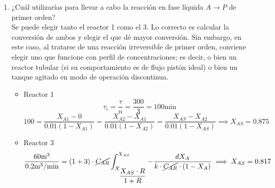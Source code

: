 \begin{enumerate}[label={\alph*)}]
\begin{itemize}
		            \noindent Solo existe una opción de modelización: la de modelos mezclados. El reactor es de tipo tanque agitado.
		      \item \textbf{Para el reactor 3:}\\
		            No existe bypass ni volumen estanco, puesto que $\int E\,d\theta = 1$ y $\int \theta E\,d\theta = 1$. Con la última integral se calcula la varianza:
		            \begin{equation*}
			            \sigma^2 = \int \theta^2 E\,d\theta - 1 = 1.75 -1 = 0.75
		            \end{equation*}
		            Por lo tanto, estamos ante un reactor de tipo tanque agitado, el cual modelizamos como un RCFP con recirculación (RCFP-R), recordando que la recirculación se puede calcular mediante la varianza:
		            \begin{equation*}
			            \sigma^2 = \frac{1}{1+R} \quad \implies R = 3
		            \end{equation*}
	      \end{itemize}
	\item ¿Cuál utilizarías para llevar a cabo la reacción en fase líquida $A \rightarrow P$ de primer orden?\\
	      Se puede elegir tanto el reactor 1 como el 3. Lo correcto es calcular la conversión de ambos y elegir el que dé mayor conversión. Sin embargo, en este caso, al tratarse de una reacción irreversible de primer orden, conviene elegir uno que funcione con perfil de concentraciones; es decir, o bien un reactor tubular (si su comportamiento es de flujo pistón ideal) o bien un tanque agitado en modo de operación discontinua.
	      \begin{itemize}
		      \item Reactor 1
		            \begin{equation*}
			            \tau_{i} = \frac{\tau}{n} = \frac{300}{3} = 100\text{min}
		            \end{equation*}
		            \begin{equation*}
			            100 = \frac{X_{A1}-0}{0.01(1-X_{A1})} = \frac{X_{A2}-X_{A1}}{0.01(1-X_{A2})} = \frac{X_{AS}-X_{A2}}{0.01(1-X_{AS})} \implies X_{AS} = 0.875
		            \end{equation*}
		      \item Reactor 3
		            \begin{equation*}
			            \frac{60\text{m}^3}{0.2\text{m}^3/\text{min}} = (1+3)\cdot \cancel{C_{AR}}\int_{X_{\dfrac{X_{AS}\cdot R}{1+R}}}^{X_{AS}}-\frac{dX_A}{k\cdot \cancel{C_{AR}}\cdot (1-X_A)} \implies X_{AS} = 0.817

\end{equation*}
\end{itemize}
\end{enumerate}
